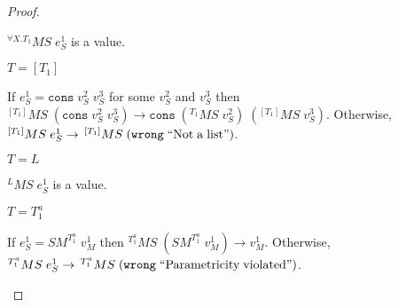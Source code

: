 \begin{mps}
\begin{proof}
\begin{mps-case-14}
\begin{mps-case-14-3}
$^{\forall X.T_{1}}MS\;e_{S}^{1}$ is a value.
\end{mps-case-14-3}
\begin{mps-case-14-4}
$T=[T_{1}]$

If $e_{S}^{1}=\mathtt{cons}\;v_{S}^{2}\;v_{S}^{3}$ for some $v_{S}^{2}$ and $v_{S}^{3}$ then $^{[T_{1}]}MS\;(\mathtt{cons}\;v_{S}^{2}\;v_{S}^{3})\rightarrow\mathtt{cons}\;(^{T_{1}}MS\;v_{S}^{2})\;(^{[T_{1}]}MS\;v_{S}^{3})$.  Otherwise, $^{[T_{1}]}MS\;e_{S}^{1}\rightarrow\,^{[T_{1}]}MS\;(\mathtt{wrong}\;\mathrm{``Not\;a\;list"})$.
\end{mps-case-14-4}
\begin{mps-case-14-5}
$T=L$

$^{L}MS\;e_{S}^{1}$ is a value.
\end{mps-case-14-5}
\begin{mps-case-14-6}
$T=T_{1}^{a}$

If $e_{S}^{1}=SM^{T_{1}^{a}}\;v_{M}^{1}$ then $^{T_{1}^{a}}MS\;(SM^{T_{1}^{a}}\;v_{M}^{1})\rightarrow v_{M}^{1}$.  Otherwise, $^{T_{1}^{a}}MS\;e_{S}^{1}\rightarrow\,^{T_{1}^{a}}MS\;(\mathtt{wrong}\;\mathrm{``Parametricity\;violated"})$.
\end{mps-case-14-6}
\end{mps-case-14}
\end{proof}
\end{mps}